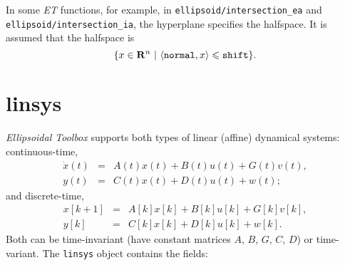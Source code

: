 In some {\it ET} functions, for example, in {\tt ellipsoid/intersection\_ea}
and {\tt ellipsoid/intersection\_ia}, the hyperplane specifies the halfspace.
It is assumed that the halfspace is
\[ \{ x\in{\bf R}^n ~|~ \langle{\tt normal},x\rangle\leq{\tt shift}\}. \]



\section{linsys}
{\it Ellipsoidal Toolbox}  supports both types of linear (affine)
dynamical systems: continuous-time,
\begin{eqnarray*}
\dot{x}(t) & = & A(t)x(t) + B(t)u(t) + G(t)v(t),\\
y(t) & = & C(t)x(t) + D(t)u(t) + w(t);
\end{eqnarray*}
and discrete-time,
\begin{eqnarray*}
x[k+1] & = & A[k]x[k] + B[k]u[k] + G[k]v[k], \\
y[k] & = & C[k]x[k] + D[k]u[k] + w[k].
\end{eqnarray*}
Both can be time-invariant (have constant matrices $A$, $B$, $G$, $C$, $D$)
or time-variant.
\newline
The {\tt linsys} object contains the fields:
